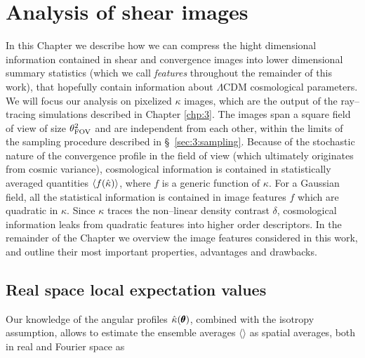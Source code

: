 
\chapter{Analysis of shear images}
\lhead[\fancyplain{}{\thepage}]{\fancyplain{}{\rightmark}}
 \thispagestyle{plain}
\setlength{\parindent}{10mm}

In this Chapter we describe how we can compress the hight dimensional information contained in shear and convergence images into lower dimensional summary statistics (which we call \textit{features} throughout the remainder of this work), that hopefully contain information about $\Lambda$CDM cosmological parameters. We will focus our analysis on pixelized $\kappa$ images, which are the output of the ray--tracing simulations described in Chapter \ref{chp:3}. The images span a square field of view of size $\theta_{\rm FOV}^2$ and are independent from each other, within the limits of the sampling procedure described in \S~\ref{sec:3:sampling}. Because of the stochastic nature of the convergence profile in the field of view (which ultimately originates from cosmic variance), cosmological information is contained in statistically averaged quantities $\langle f(\hat{\kappa})\rangle$, where $f$ is a generic function of $\kappa$. For a Gaussian field, all the statistical information is contained in image features $f$ which are quadratic in $\kappa$. Since $\kappa$ traces the non--linear density contrast $\delta$, cosmological information leaks from quadratic features into higher order descriptors. In the remainder of the Chapter we overview the image features considered in this work, and outline their most important properties, advantages and drawbacks.

\section{Real space local expectation values}
Our knowledge of the angular profiles $\hat{\kappa}(\pmb{\theta})$, combined with the isotropy assumption, allows to estimate the ensemble averages $\langle\rangle$ as spatial averages, both in real and Fourier space as 

